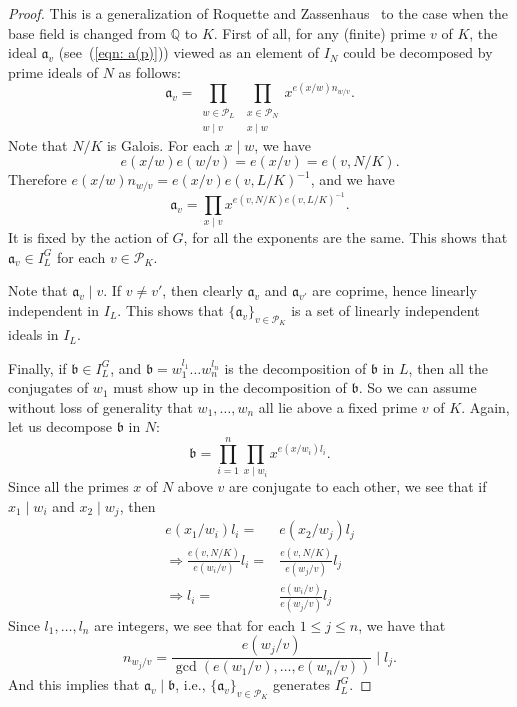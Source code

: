 \documentclass{amsart}
\numberwithin{equation}{section}
\theoremstyle{plain}
\theoremstyle{definition}
\theoremstyle{remark}
\begin{document}
\begin{proof}
	This is a generalization of Roquette and Zassenhaus~\cite[(6)]{RZ1969ClassRank} to the case when the base field is changed from $\mathbb{Q}$ to $K$.
	First of all, for any (finite) prime $v$ of $K$, the ideal $\mathfrak{a}_{v}$ (see~(\ref{eqn: a(p)})) viewed as an element of $I_N$ could be decomposed by prime ideals of $N$ as follows:
	\begin{equation*}
		\mathfrak{a}_{v}=
		\prod_{
			\substack{
				w\in\mathcal{P}_L\\
				w\mid v
			}
		}
		\prod_{
			\substack{
				x\in\mathcal{P}_N\\
				x\mid w
			}
		}x^{e(x/w)n_{w/v}}.
	\end{equation*}
	Note that $N/K$ is Galois.
        For each $x\mid w$, we have 
	\begin{equation*}
		e(x/w)e(w/v)=e(x/v)=e(v,N/K).
	\end{equation*}
	Therefore $e(x/w)n_{w/v}=e(x/v)e(v,L/K)^{-1}$, and we have
	\begin{equation*}
		\mathfrak{a}_v=\prod_{x\mid v}x^{e(v,N/K)e(v,L/K)^{-1}}.
	\end{equation*} 
	It is fixed by the action of $G$, for all the exponents are the same.
	This shows that $\mathfrak{a}_v\in I_L^G$ for each $v\in\mathcal{P}_K$.
	
	Note that $\mathfrak{a}_v\mid v$.
	If $v\neq v'$, then clearly $\mathfrak{a}_v$ and $\mathfrak{a}_{v'}$ are coprime, hence linearly independent in $I_L$.
	This shows that $\{\mathfrak{a}_v\}_{v\in\mathcal{P}_K}$ is a set of linearly independent ideals in $I_L$.
	
	Finally, if $\mathfrak{b}\in I_L^G$, and $\mathfrak{b}=w_1^{l_1}\dots w_n^{l_n}$ is the decomposition of $\mathfrak{b}$ in $L$, then all the conjugates of $w_1$ must show up in the decomposition of $\mathfrak{b}$.
	So we can assume without loss of generality that $w_1,\dots,w_n$ all lie above a fixed prime $v$ of $K$.
	Again, let us decompose $\mathfrak{b}$ in $N$:
	\begin{equation*}
		\mathfrak{b}=\prod_{i=1}^{n}\prod_{x\mid w_i}x^{e(x/w_i)l_i}.
	\end{equation*}
	Since all the primes $x$ of $N$ above $v$ are conjugate to each other, we see that if $x_1\mid w_i$ and $x_2\mid w_j$, then
	\begin{equation*}
		\begin{aligned}
			e(x_1/w_i)l_i=&e(x_2/w_j)l_j
			\\
			\Rightarrow\frac{e(v,N/K)}{e(w_i/v)}l_i=&\frac{e(v,N/K)}{e(w_j/v)}l_j
			\\
			\Rightarrow l_i=&\frac{e(w_i/v)}{e(w_j/v)}l_j
		\end{aligned}		
	\end{equation*}
	Since $l_1,\dots,l_n$ are integers, we see that for each $1\leq j\leq n$, we have that
	\begin{equation*}
		n_{w_j/v}=\frac{e(w_j/v)}{\gcd(e(w_1/v),\dots,e(w_n/v))}\mid l_j.
	\end{equation*}
	And this implies that $\mathfrak{a}_v\mid\mathfrak{b}$, i.e., $\{\mathfrak{a}_v\}_{v\in\mathcal{P}_K}$ generates $I_L^G$.
\end{proof}
\end{document}
